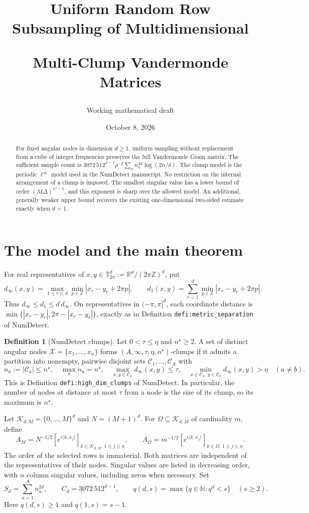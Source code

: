 \documentclass[11pt]{article}
\title{Uniform Random Row Subsampling of Multidimensional\par Multi-Clump Vandermonde Matrices}
\author{Working mathematical draft}
\date{October 8, 2026}
\theoremstyle{definition}\newtheorem{definition}[theorem]{Definition}
\theoremstyle{remark}\newtheorem{remark}[theorem]{Remark}
\newcommand{\T}{\mathbb T_{2\pi}}
\newcommand{\R}{\mathbb R}
\newcommand{\abs}[1]{\left|#1\right|}
\begin{document}
\maketitle
\begin{abstract}
For fixed angular nodes in dimension $d\ge1$, uniform sampling without
replacement from a cube of integer frequencies preserves the full
Vandermonde Gram matrix. The sufficient sample count is
$3072\,512^{d-1}\rho^{-2}\sum_a n_a^{2d}\log(2n/\delta)$.
The clump model is the periodic $\ell^\infty$ model used in the NumDetect
manuscript. No restriction on the internal arrangement of a clump is imposed.
The smallest singular value has a lower bound of order
$(M\Delta)^{n^\star-1}$, and this exponent is sharp over the allowed model.
An additional, generally weaker upper bound recovers the existing
one-dimensional two-sided estimate exactly when $d=1$.
\end{abstract}

\section{The model and the main theorem}
For real representatives of $x,y\in\T^d:=\R^d/(2\pi\mathbb Z)^d$, put
\[
 d_\infty(x,y)=\max_{1\le r\le d}\min_{p\in\mathbb Z}
       \abs{x_r-y_r+2\pi p},\qquad
 d_1(x,y)=\sum_{r=1}^d\min_{p\in\mathbb Z}\abs{x_r-y_r+2\pi p}.
\]
Thus $d_\infty\le d_1\le d\,d_\infty$. On representatives in
$(-\pi,\pi]^d$, each coordinate distance is
$\min\{\abs{x_r-y_r},2\pi-\abs{x_r-y_r}\}$, exactly as in
Definition \texttt{defi:metric\_separation} of NumDetect.

\begin{definition}[NumDetect clumps]\label{def:multidimensional-clumps}
Let $0<\tau\le\eta$ and $n^\star\ge2$. A set of distinct angular nodes
$\mathcal X=\{x_1,\ldots,x_n\}$ forms
$(A,\infty,\tau,\eta,n^\star)$-clumps if it admits a partition into
nonempty, pairwise disjoint sets $\mathcal C_1,\ldots,\mathcal C_A$ with
\[
 n_a:=\abs{\mathcal C_a}\le n^\star,\quad
 \max_a n_a=n^\star,\quad
 \max_{x,y\in\mathcal C_a}d_\infty(x,y)\le\tau,\quad
 \min_{x\in\mathcal C_a,\,y\in\mathcal C_b}d_\infty(x,y)>\eta\quad(a\ne b).
\]
This is Definition \texttt{defi:high\_dim\_clumps} of NumDetect. In particular,
the number of nodes at distance at most $\tau$ from a node is the size of
its clump, so its maximum is $n^\star$.
\end{definition}

Let $\mathcal K_{d,M}=\{0,\ldots,M\}^d$ and $N=(M+1)^d$.
For $\Omega\subseteq\mathcal K_{d,M}$ of cardinality $m$, define
\[
 A_M=N^{-1/2}[e^{i\langle k,x_j\rangle}]_{k\in\mathcal K_{d,M},\,1\le j\le n},
 \qquad
 A_\Omega=m^{-1/2}[e^{i\langle k,x_j\rangle}]_{k\in\Omega,\,1\le j\le n}.
\]
The order of the selected rows is immaterial. Both matrices are independent
of the representatives of their nodes. Singular values are listed in
decreasing order, with $n$ column singular values, including zeros when
necessary. Set
\[
 S_d=\sum_{a=1}^A n_a^{2d},\qquad
 C_d=3072\,512^{d-1},\qquad
 q(d,s)=\max\{q\in\mathbb N:q^d<s\}\quad(s\ge2).
\]
Here $q(d,s)\ge1$ and $q(1,s)=s-1$.
\end{document}
